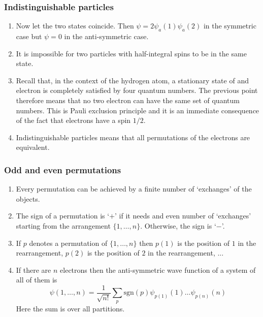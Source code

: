 \documentclass{beamer}
\begin{document}
\begin{frame}
\frametitle{Indistinguishable particles}
\begin{enumerate}
\item Now let the two states coincide. Then $\psi = 2\psi_a(1)\psi_a(2)$ in the
symmetric case but $\psi = 0$ in the anti-symmetric case.
\item It is impossible for two particles with half-integral spins to be in the 
same state.
\item Recall that, in the context of the hydrogen atom, a stationary state of
and electron is completely satisfied by four quantum numbers. The previous point
therefore means that no two electron can have the same set of quantum numbers.
This is Pauli exclusion principle and it is an immediate consequence of the fact
that electrons have a spin $1/2$.
\item Indistinguishable particles means that all permutations of the electrons 
are equivalent.
\end{enumerate}
\end{frame}

\begin{frame}
\frametitle{Odd and even permutations}
\begin{enumerate}
\item Every permutation can be achieved by a finite number of `exchanges' of the
objects.
\item The sign of a permutation is `$+$' if it needs and even number of `exchanges'
starting from the arrangement $\{1, \ldots, n\}$. Otherwise, the sign is `$-$'. 
\item If $p$ denotes a permutation of $\{1, \ldots, n\}$ then $p(1)$ is the 
position of $1$ in the rearrangement, $p(2)$ is the position of $2$ in the 
rearrangement, ...
\item If there are $n$ electrons then the anti-symmetric wave function of a system
of all of them is
\begin{equation}\label{e6}
\psi(1, \ldots, n) = \frac{1}{\sqrt{n!}}
 \sum_{p}\text{sgn}(p)\psi_{p(1)}(1)\ldots\psi_{p(n)}(n)
\end{equation}
Here the sum is over all partitions.
\end{enumerate}
\end{frame}
\end{document}

